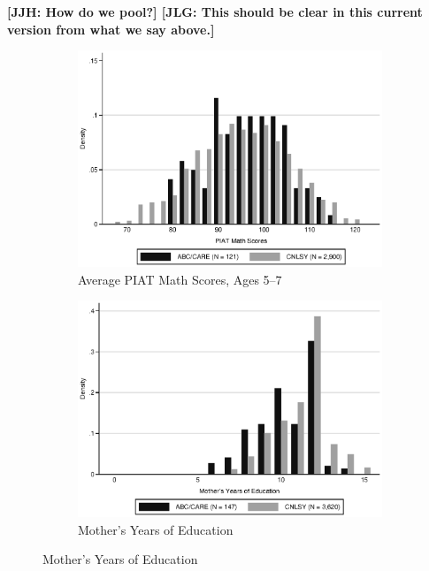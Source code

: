 \noindent \textbf{[JJH: How do we pool?] [JLG: This should be clear in this current version from what we say above.]}\\

\begin{figure}[H]
		\caption{Support of ABC/CARE and Auxiliary Data} \label{fig:support}
	\begin{subfigure}[h]{0.8\textwidth}
	\centering
	\caption{Average PIAT Math Scores, Ages 5--7} \label{fig:support_math}
	\includegraphics[width=\textwidth]{AppOutput/Methodology/support_math.eps}
	\end{subfigure}
	
	\begin{subfigure}[h]{0.8\textwidth}
	\centering
	\caption{Mother's Years of Education} \label{fig:support_meduc}
	\includegraphics[width=\textwidth]{AppOutput/Methodology/support_momed.eps}
	\end{subfigure}
	
\end{figure}

